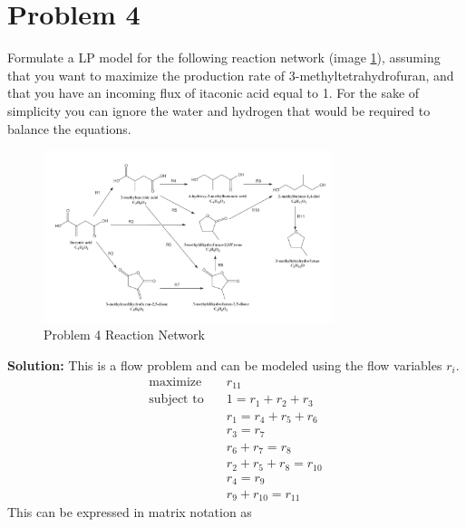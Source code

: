 \documentclass[11pt]{article}
\begin{document}
\section{Problem 4}
Formulate a LP model for the following reaction network (image \ref{fig:problem_4_rn}), assuming that you want
to maximize the production rate of 3-methyltetrahydrofuran, and that you have an incoming
flux of itaconic acid equal to 1. For the sake of simplicity you can ignore the water and
hydrogen that would be required to balance the equations.
\begin{figure}[htbp]
  \centerline{\includegraphics[width=0.75\textwidth]{images/image.png}}
  \caption{Problem 4 Reaction Network}
  \label{fig:problem_4_rn}
\end{figure}

\textbf{Solution: }
This is a flow problem and can be modeled using the flow variables $r_i$.
\begin{align*}
  \text{maximize} & \quad r_{11} \\
  \text{subject to} & \quad 1 = r_1 + r_2 + r_3 \\
  & \quad r_1 = r_4 + r_5 + r_6 \\
  & \quad r_3 = r_7 \\
  & \quad r_6 + r_7 = r_8 \\
  & \quad r_2 + r_5 + r_8 = r_{10} \\
  & \quad r_4 = r_9 \\
  & \quad r_9 + r_{10} = r_{11}
\end{align*}
This can be expressed in matrix notation as
\end{document}
